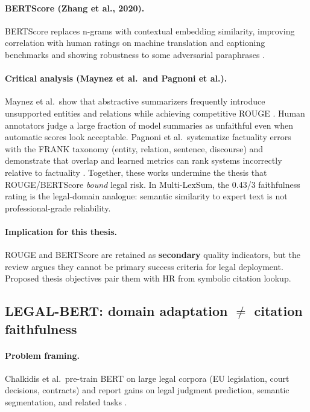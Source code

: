 \paragraph{BERTScore (Zhang et al., 2020).}
BERTScore replaces n-grams with contextual embedding similarity, improving correlation with human ratings on machine translation and captioning benchmarks and showing robustness to some adversarial paraphrases \cite{zhang2020bertscore}.

\paragraph{Critical analysis (Maynez et al.\ and Pagnoni et al.).}
Maynez et al.\ show that abstractive summarizers frequently introduce unsupported entities and relations while achieving competitive ROUGE \cite{maynez2020faithfulness}. Human annotators judge a large fraction of model summaries as unfaithful even when automatic scores look acceptable. Pagnoni et al.\ systematize factuality errors with the FRANK taxonomy (entity, relation, sentence, discourse) and demonstrate that overlap and learned metrics can rank systems incorrectly relative to factuality \cite{pagnoni2021factuality}. Together, these works undermine the thesis that ROUGE/BERTScore \emph{bound} legal risk. In Multi-LexSum, the 0.43/3 faithfulness rating is the legal-domain analogue: semantic similarity to expert text is not professional-grade reliability.

\paragraph{Implication for this thesis.}
ROUGE and BERTScore are retained as \textbf{secondary} quality indicators, but the review argues they cannot be primary success criteria for legal deployment. Proposed thesis objectives pair them with HR from symbolic citation lookup.

\subsection{LEGAL-BERT: domain adaptation $\neq$ citation faithfulness}
\label{sec:lit-legalbert}

\paragraph{Problem framing.}
Chalkidis et al.\ pre-train BERT on large legal corpora (EU legislation, court decisions, contracts) and report gains on legal judgment prediction, semantic segmentation, and related tasks \cite{chalkidis2020legalbert}.

